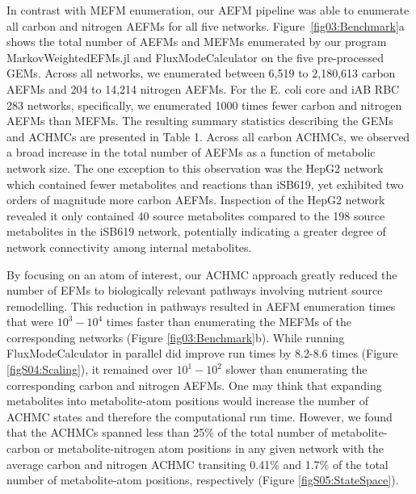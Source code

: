 \documentclass[12pt]{article}
\begin{document}
In contrast with MEFM enumeration, our AEFM pipeline was able to enumerate
all carbon and nitrogen AEFMs for all five networks.
Figure~\ref{fig03:Benchmark}a shows the total number of AEFMs and MEFMs
enumerated by our program MarkovWeightedEFMs.jl and FluxModeCalculator on
the five pre-processed GEMs. Across all networks, we enumerated between
6,519 to 2,180,613 carbon AEFMs and 204 to 14,214 nitrogen AEFMs. For the
E. coli core and iAB RBC
283 networks, specifically, we enumerated 1000 times fewer carbon and
    nitrogen AEFMs than MEFMs. The resulting summary statistics describing
    the GEMs and ACHMCs are presented in Table 1. Across all carbon
    ACHMCs, we observed a broad increase in the total number of AEFMs as
    a function of metabolic network size. The one exception to this
    observation was the HepG2 network which contained fewer metabolites
    and reactions than iSB619, yet exhibited two orders of magnitude more
    carbon AEFMs. Inspection of the HepG2 network revealed it only
    contained 40 source metabolites compared to the 198 source metabolites
    in the iSB619 network, potentially indicating a greater degree of
    network connectivity among internal metabolites.

By focusing on an atom of interest, our ACHMC approach greatly reduced the
number of EFMs to biologically relevant pathways involving nutrient source
remodelling. This reduction in pathways resulted in AEFM enumeration times
that were $10^3-10^4$ times faster than enumerating the MEFMs of the
corresponding networks (Figure \ref{fig03:Benchmark}b). While running
FluxModeCalculator in parallel did improve run times by
8.2-8.6 times (Figure \ref{figS04:Scaling}), it remained over $10^1-10^2$
slower than enumerating the corresponding carbon and nitrogen AEFMs. One
may think that expanding metabolites into metabolite-atom positions would
increase the number of ACHMC states and therefore the computational run
time. However, we found that the ACHMCs spanned less than 25\% of the
total number of metabolite-carbon or metabolite-nitrogen atom positions in
any given network with the average carbon and nitrogen ACHMC transiting
0.41\% and 1.7\% of the total number of metabolite-atom positions,
respectively (Figure \ref{figS05:StateSpace}). 
\end{document}
